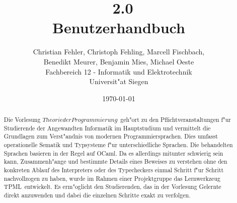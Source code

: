 \documentclass[a4paper,fleqn,latin1,twoside,12pt]{report}
\title{{\Huge \TPML\ 2.0}\\Benutzerhandbuch}
\author{{\Large Christian Fehler, Christoph Fehling, Marcell Fischbach,}\\{\Large Benedikt Meurer, Benjamin Mies, Michael Oeste}\\Fachbereich 12 - Informatik und Elektrotechnik\\Universit"at Siegen}
\date{\small\today}
\newcommand{\TPML}{\textsf{\textmd{TPML}}}
\begin{document}
\maketitle

\begin{abstract}
Die Vorlesung \glqq$Theorie der Programmierung$\grqq\ geh"ort zu den Pflichtveranstaltungen
f"ur Studierende der Angewandten Informatik im Hauptstudium und vermittelt die Grundlagen
zum Verst"andnis von modernen Programmiersprachen. Dies umfasst operationelle Sematik und
Typsysteme f"ur unterschiedliche Sprachen. Die behandelten Sprachen basieren in der Regel
auf OCaml. Da es allerdings mitunter schwierig sein kann, Zusammenh"ange und bestimmte Details
eines Beweises zu verstehen ohne den konkreten Ablauf des Interpreters oder des Typecheckers
einmal Schritt f"ur Schritt nachvollzogen zu haben, wurde im Rahmen einer Projektgruppe das
Lernwerkzeug \TPML\ entwickelt. Es erm"oglicht den Studierenden, das in der Vorlesung Gelernte
direkt anzuwenden und dabei die einzelnen Schritte exakt zu verfolgen.
\end{abstract}

\tableofcontents
\newpage









\begin{appendix}

\end{appendix}

\printindex
\end{document}
